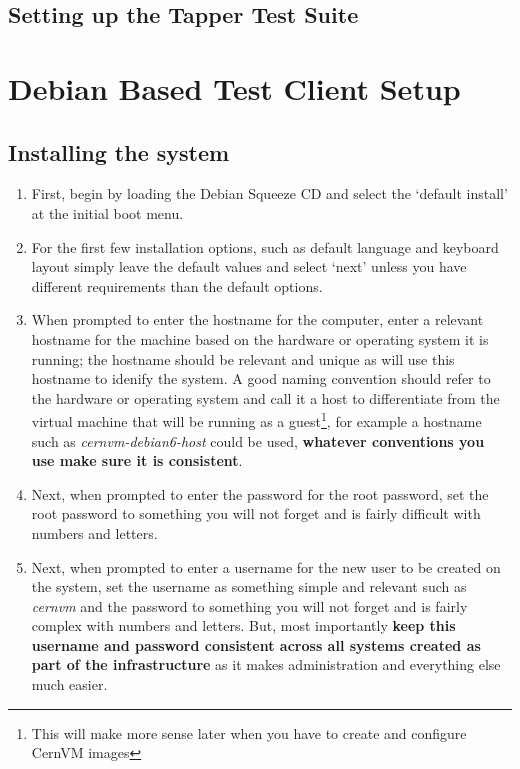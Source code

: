 \subsection{Setting up the Tapper Test Suite}

\section{Debian Based Test Client Setup}
\subsection{Installing the system}
\label{sec:debianinstall}
\flushleft
\begin{enumerate}
\item First, begin by loading the Debian Squeeze CD and select the `default install' at the initial boot menu.

\item For the first few installation options, such as default language and keyboard layout simply leave the default values and select
`next' unless you have different requirements than the default options.

\item When prompted to enter the hostname for the computer, enter a relevant hostname for the machine based on the hardware or operating
system it is running; the hostname should be relevant and unique as \tapper will use this hostname to idenify the system. A good naming
convention should refer to the hardware or operating system and call it a host to differentiate from the virtual machine that will be
running as a guest\footnote{This will make more sense later when you have to create and configure CernVM images}, for example a hostname such
as \emph{cernvm-debian6-host} could be used, {\bf whatever conventions you use make sure it is consistent}.

\item Next, when prompted to enter the password for the root password, set the root password to something you will not forget and is fairly
difficult with numbers and letters.

\item Next, when prompted to enter a username for the new user to be created on the system, set the username as something simple and relevant
such as \emph{cernvm} and the password to something you will not forget and is fairly complex with numbers and letters. But, most importantly 
{\bf keep this username and password consistent across all systems created as part of the infrastructure} as it makes administration and everything
else much easier.


\end{enumerate}
